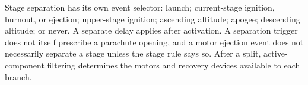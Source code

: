 Stage separation has its own event selector: launch; current-stage ignition, burnout, or ejection; upper-stage ignition; ascending altitude; apogee; descending altitude; or never. A separate delay applies after activation. A separation trigger does not itself prescribe a parachute opening, and a motor ejection event does not necessarily separate a stage unless the stage rule says so. After a split, active-component filtering determines the motors and recovery devices available to each branch.

